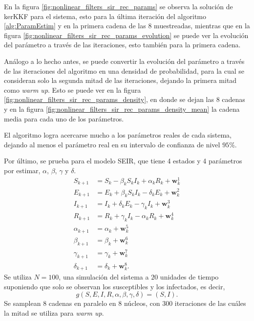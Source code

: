 En la figura \ref{fig:nonlinear_filters_sir_rec_params} se observa la solución de kerKKF para el sistema, esto para la última iteración del algoritmo \ref{alg:ParamEstim} y en la primera cadena de las $8$ muestreadas, mientras que en la figura \ref{fig:nonlinear_filters_sir_rec_params_evolution} se puede ver la evolución del parámetro a través de las iteraciones, esto también para la primera cadena.

Análogo a lo hecho antes, se puede convertir la evolución del parámetro a través de las iteraciones del algoritmo en una densidad de probabilidad, para la cual se consideran solo la segunda mitad de las iteraciones, dejando la primera mitad como \textit{warm up}. Esto se puede ver en la figura \ref{fig:nonlinear_filters_sir_rec_params_density}, en donde se dejan las $8$ cadenas y en la figura \ref{fig:nonlinear_filters_sir_rec_params_density_mean} la cadena media para cada uno de los parámetros.

El algoritmo logra acercarse mucho a los parámetros reales de cada sistema, dejando al menos el parámetro real en su intervalo de confianza de nivel $95$\%.

Por último, se prueba para el modelo SEIR, que tiene 4 estados y 4 parámetros por estimar, $\alpha$, $\beta$, $\gamma$ y $\delta$.
\begin{equation*}
    \begin{aligned}
        S_{k+1} &= S_k - \beta_k S_k I_k + \alpha_k R_k + \mathbf{w}_k^1 \\
        E_{k+1} &= E_k + \beta_k S_k I_k - \delta_k E_k + \mathbf{w}_k^2 \\
        I_{k+1} &= I_k + \delta_k E_k - \gamma_k I_k + \mathbf{w}_k^3 \\
        R_{k+1} &= R_k + \gamma_k I_k - \alpha_k R_k + \mathbf{w}_k^4 \\
        \alpha_{k+1} &= \alpha_k + \mathbf{w}_k^5 \\
        \beta_{k+1} &= \beta_k + \mathbf{w}_k^6 \\
        \gamma_{k+1} &= \gamma_k + \mathbf{w}_k^7 \\
        \delta_{k+1} &= \delta_k + \mathbf{w}_k^8.
    \end{aligned}
\end{equation*}
Se utiliza $N=100$, una simulación del sistema a $20$ unidades de tiempo suponiendo que solo se observan los susceptibles y los infectados, es decir,
\begin{equation*}
    g(S, E, I, R, \alpha, \beta, \gamma, \delta) = (S, I).
\end{equation*}
Se samplean $8$ cadenas en paralelo en $8$ núcleos, con $300$ iteraciones de las cuáles la mitad se utiliza para \textit{warm up}.


